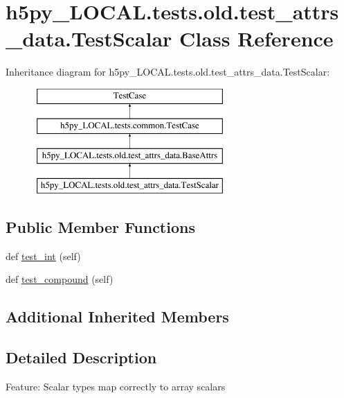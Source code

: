 \hypertarget{classh5py__LOCAL_1_1tests_1_1old_1_1test__attrs__data_1_1TestScalar}{}\section{h5py\+\_\+\+L\+O\+C\+A\+L.\+tests.\+old.\+test\+\_\+attrs\+\_\+data.\+Test\+Scalar Class Reference}
\label{classh5py__LOCAL_1_1tests_1_1old_1_1test__attrs__data_1_1TestScalar}
Inheritance diagram for h5py\+\_\+\+L\+O\+C\+A\+L.\+tests.\+old.\+test\+\_\+attrs\+\_\+data.\+Test\+Scalar\+:\begin{figure}[H]
\begin{center}
\leavevmode
\includegraphics[height=4.000000cm]{classh5py__LOCAL_1_1tests_1_1old_1_1test__attrs__data_1_1TestScalar}
\end{center}
\end{figure}
\subsection*{Public Member Functions}
\begin{DoxyCompactItemize}
\item 
def \hyperlink{classh5py__LOCAL_1_1tests_1_1old_1_1test__attrs__data_1_1TestScalar_aca87be5f2c02ef4772061fd377dcc862}{test\+\_\+int} (self)
\item 
def \hyperlink{classh5py__LOCAL_1_1tests_1_1old_1_1test__attrs__data_1_1TestScalar_ab636fcea0d79440df1242558c7e1491b}{test\+\_\+compound} (self)
\end{DoxyCompactItemize}
\subsection*{Additional Inherited Members}


\subsection{Detailed Description}
\begin{DoxyVerb}    Feature: Scalar types map correctly to array scalars
\end{DoxyVerb}
 

